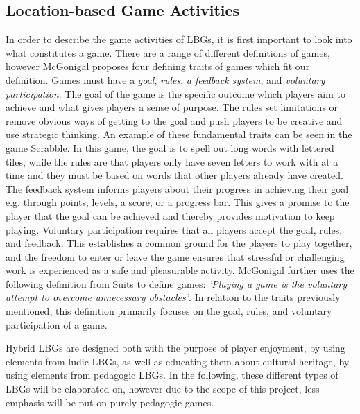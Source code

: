 \subsection{Location-based Game Activities}
In order to describe the game activities of LBGs, it is first important to look into what constitutes a game. There are a range of different definitions of games, however McGonigal proposes four defining traits of games which fit our definition\cite{RealityIsBroken}. Games must have a \textit{goal}, \textit{rules}, \textit{a feedback system}, and \textit{voluntary participation}. The goal of the game is the specific outcome which players aim to achieve and what gives players a sense of purpose. The rules set limitations or remove obvious ways of getting to the goal and push players to be creative and use strategic thinking. An example of these fundamental traits can be seen in the game Scrabble. In this game, the goal is to spell out long words with lettered tiles, while the rules are that players only have seven letters to work with at a time and they must be based on words that other players already have created. The feedback system informs players about their progress in achieving their goal e.g. through points, levels, a score, or a progress bar. This gives a promise to the player that the goal can be achieved and thereby provides motivation to keep playing. Voluntary participation requires that all players accept the goal, rules, and feedback. This establishes a common ground for the players to play together, and the freedom to enter or leave the game ensures that stressful or challenging work is experienced as a safe and pleasurable activity. McGonigal further uses the following definition from Suits to define games: \emph{'Playing a game is the voluntary attempt to overcome unnecessary obstacles'}\cite{RealityIsBroken}. In relation to the traits previously mentioned, this definition primarily focuses on the goal, rules, and voluntary participation of a game. 

Hybrid LBGs are designed both with the purpose of player enjoyment, by using elements from ludic LBGs, as well as educating them about cultural heritage, by using elements from pedagogic LBGs\cite{LBG_Review}. In the following, these different types of LBGs will be elaborated on, however due to the scope of this project, less emphasis will be put on purely pedagogic games.

